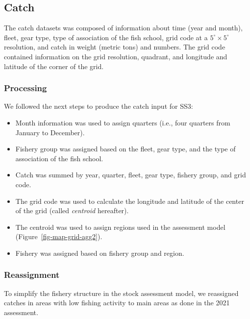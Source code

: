 \documentclass[
]{scrartcl}
\providecommand{\tightlist}{%
  \setlength{\itemsep}{0pt}\setlength{\parskip}{0pt}}\usepackage{longtable,booktabs,array}
\begin{document}
\subsection{Catch}\label{catch}

The catch datasets was composed of information about time (year and
month), fleet, gear type, type of association of the fish school, grid
code at a \(5^\circ\times 5^\circ\) resolution, and catch in weight
(metric tons) and numbers. The grid code contained information on the
grid resolution, quadrant, and longitude and latitude of the corner of
the grid.

\subsubsection{Processing}\label{processing}

We followed the next steps to produce the catch input for SS3:

\begin{itemize}
\tightlist
\item
  Month information was used to assign quarters (i.e., four quarters
  from January to December).
\item
  Fishery group was assigned based on the fleet, gear type, and the type
  of association of the fish school.
\item
  Catch was summed by year, quarter, fleet, gear type, fishery group,
  and grid code.
\item
  The grid code was used to calculate the longitude and latitude of the
  center of the grid (called \emph{centroid} hereafter).
\item
  The centroid was used to assign regions used in the assessment model
  (Figure~\ref{fig-map-grid-agg2}).
\item
  Fishery was assigned based on fishery group and region.
\end{itemize}

\subsubsection{Reassignment}\label{sec-catchreassign}

To simplify the fishery structure in the stock assessment model, we
reassigned catches in areas with low fishing activity to main areas as
done in the 2021 assessment.
\end{document}
